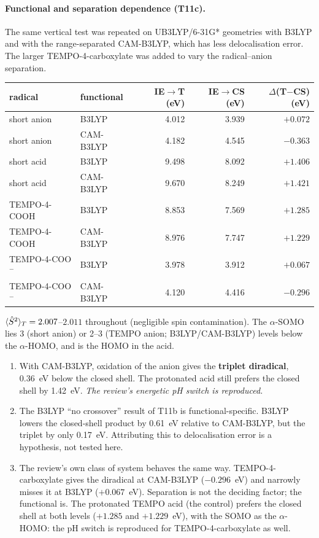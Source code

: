 \paragraph{Functional and separation dependence (T11c).} The same vertical test was repeated on
UB3LYP/6-31G* geometries with B3LYP and with the range-separated CAM-B3LYP, which has less
delocalisation error. The larger TEMPO-4-carboxylate was added to vary the radical--anion separation.
\begin{center}
\begin{tabular}{llrrr}
\toprule
radical & functional & IE$\to$T (eV) & IE$\to$CS (eV) & $\Delta$(T$-$CS) (eV)\\
\midrule
short anion & B3LYP     & 4.012 & 3.939 & $+0.072$\\
short anion & CAM-B3LYP & 4.182 & 4.545 & $\mathbf{-0.363}$\\
short acid  & B3LYP     & 9.498 & 8.092 & $+1.406$\\
short acid  & CAM-B3LYP & 9.670 & 8.249 & $+1.421$\\
TEMPO-4-COOH & B3LYP & 8.853 & 7.569 & $+1.285$\\
TEMPO-4-COOH & CAM-B3LYP & 8.976 & 7.747 & $+1.229$\\
TEMPO-4-COO$^-$ & B3LYP & 3.978 & 3.912 & $+0.067$\\
TEMPO-4-COO$^-$ & CAM-B3LYP & 4.120 & 4.416 & $\mathbf{-0.296}$\\
\bottomrule
\end{tabular}
\end{center}
$\langle \hat S^2\rangle_T=2.007$--$2.011$ throughout (negligible spin contamination). The $\alpha$-SOMO lies 3 (short
anion) or 2--3 (TEMPO anion; B3LYP/CAM-B3LYP) levels below the $\alpha$-HOMO, and is the HOMO in the acid.
\begin{enumerate}
  \item With CAM-B3LYP, oxidation of the anion gives the \textbf{triplet diradical}, 0.36~eV below the closed
        shell. The protonated acid still prefers the closed shell by 1.42~eV. \emph{The review's energetic pH
        switch is reproduced.}
  \item The B3LYP ``no crossover'' result of T11b is functional-specific. B3LYP lowers the closed-shell
        product by 0.61~eV relative to CAM-B3LYP, but the triplet by only 0.17~eV. Attributing this to
        delocalisation error is a hypothesis, not tested here.
  \item The review's own class of system behaves the same way. TEMPO-4-carboxylate gives the diradical at
        CAM-B3LYP ($-0.296$~eV) and narrowly misses it at B3LYP ($+0.067$~eV). Separation is not the deciding
        factor; the functional is. The protonated TEMPO acid (the control) prefers the closed shell at both
        levels ($+1.285$ and $+1.229$~eV), with the SOMO as the $\alpha$-HOMO: the pH switch is reproduced for
        TEMPO-4-carboxylate as well.
\end{enumerate}

